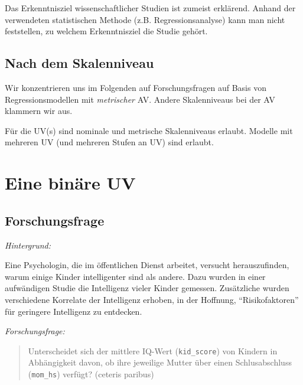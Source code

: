 \documentclass[
  a4paper,
  DIV=11]{scrreprt}
\theoremstyle{definition}
\theoremstyle{remark}
\begin{document}
\begin{tcolorbox}[enhanced jigsaw, leftrule=.75mm, toptitle=1mm, bottomtitle=1mm, titlerule=0mm, breakable, colframe=quarto-callout-note-color-frame, title=\textcolor{quarto-callout-note-color}{\faInfo}\hspace{0.5em}{Hinweis}, rightrule=.15mm, colback=white, arc=.35mm, left=2mm, bottomrule=.15mm, coltitle=black, opacitybacktitle=0.6, toprule=.15mm, colbacktitle=quarto-callout-note-color!10!white, opacityback=0]
Das Erkenntnisziel wissenschaftlicher Studien ist zumeist erklärend.
Anhand der verwendeten statistischen Methode (z.B. Regressionsanalyse)
kann man nicht feststellen, zu welchem Erkenntnisziel die Studie gehört.
\end{tcolorbox}

\hypertarget{nach-dem-skalenniveau}{%
\subsection{Nach dem Skalenniveau}\label{nach-dem-skalenniveau}}

Wir konzentrieren uns im Folgenden auf Forschungsfragen auf Basis von
Regressionsmodellen mit \emph{metrischer} AV. Andere Skalenniveaus bei
der AV klammern wir aus.

Für die UV(s) sind nominale und metrische Skalenniveaus erlaubt. Modelle
mit mehreren UV (und mehreren Stufen an UV) sind erlaubt.

\hypertarget{eine-binuxe4re-uv}{%
\section{Eine binäre UV}\label{eine-binuxe4re-uv}}

\hypertarget{forschungsfrage}{%
\subsection{Forschungsfrage}\label{forschungsfrage}}

\emph{Hintergrund:}

Eine Psychologin, die im öffentlichen Dienst arbeitet, versucht
herauszufinden, warum einige Kinder intelligenter sind als andere. Dazu
wurden in einer aufwändigen Studie die Intelligenz vieler Kinder
gemessen. Zusätzliche wurden verschiedene Korrelate der Intelligenz
erhoben, in der Hoffnung, ``Risikofaktoren'' für geringere Intelligenz
zu entdecken.

\emph{Forschungsfrage:}

\begin{quote}
Unterscheidet sich der mittlere IQ-Wert (\texttt{kid\_score}) von
Kindern in Abhängigkeit davon, ob ihre jeweilige Mutter über einen
Schlusabschluss (\texttt{mom\_hs}) verfügt? (ceteris paribus)
\end{quote}
\end{document}
